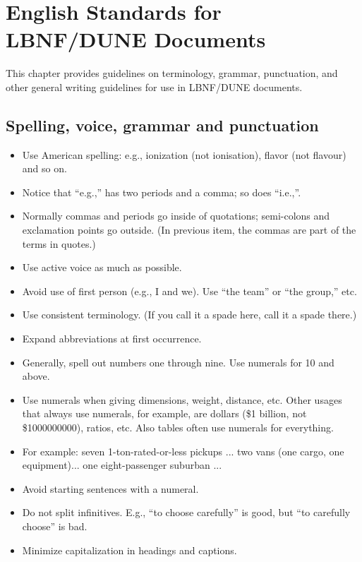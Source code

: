 \chapter{English Standards for LBNF/DUNE Documents}
\label{ch:latex-stds}

This chapter provides guidelines on terminology, grammar, punctuation, and other general writing guidelines for use in LBNF/DUNE documents. 


\section{Spelling, voice, grammar and punctuation}
\label{sec:spelling}

\begin{itemize}
\item Use American spelling: e.g., ionization (not ionisation), flavor (not flavour) and so on.
\item Notice that ``e.g.,'' has two periods and a comma; so does ``i.e.,''.
\item Normally commas and periods go inside of quotations;  semi-colons and exclamation points go outside.  (In previous item, the commas are part of the terms in quotes.)
\item Use active voice as much as possible. 
\item Avoid use of first person (e.g., I and we). Use ``the team'' or ``the group,'' etc.
\item Use consistent terminology. (If you call it a spade here, call it a spade there.)
\item Expand abbreviations at first occurrence.
\item Generally, spell out numbers one through nine. Use numerals for \num{10} and above.
\item Use numerals when giving dimensions, weight, distance, etc. Other usages that always use numerals, for example, are dollars (\$1 billion, not \$\num{1000000000}), ratios, etc. Also tables often use numerals for everything.
\item For example: seven 1-ton-rated-or-less pickups ... two vans (one cargo, one equipment)... one eight-passenger suburban ...
\item Avoid starting sentences with a numeral.
\item Do not split infinitives. E.g., ``to choose carefully'' is good, but ``to carefully choose'' is bad.
\item Minimize capitalization in headings and captions.

\end{itemize}
